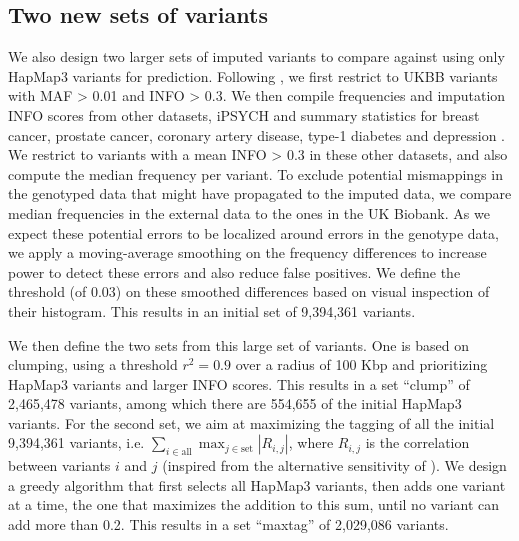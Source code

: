 \subsection{Two new sets of variants}

We also design two larger sets of imputed variants to compare against using only HapMap3 variants for prediction.
Following \cite{prive2021high}, we first restrict to UKBB variants with MAF > 0.01 and INFO > 0.3.
We then compile frequencies and imputation INFO scores from other datasets, iPSYCH and summary statistics for breast cancer, prostate cancer, coronary artery disease, type-1 diabetes and depression \cite[]{bybjerg2020ipsych2015,michailidou2017association,schumacher2018association,nikpay2015comprehensive,censin2017childhood,wray2018genome}.
We restrict to variants with a mean INFO > 0.3 in these other datasets, and also compute the median frequency per variant.
To exclude potential mismappings in the genotyped data \cite[]{kunert2020allele} that might have propagated to the imputed data, we compare median frequencies in the external data to the ones in the UK Biobank.
As we expect these potential errors to be localized around errors in the genotype data, we apply a moving-average smoothing on the frequency differences to increase power to detect these errors and also reduce false positives.
We define the threshold (of 0.03) on these smoothed differences based on visual inspection of their histogram.
This results in an initial set of 9,394,361 variants.

We then define the two sets from this large set of variants.
One is based on clumping, using a threshold $r^2 = 0.9$ over a radius of 100 Kbp and prioritizing HapMap3 variants and larger INFO scores. This results in a set ``clump'' of 2,465,478 variants, among which there are 554,655 of the initial HapMap3 variants.
For the second set, we aim at maximizing the tagging of all the initial 9,394,361 variants, i.e. $\sum_{i \in \text{all}} \max_{j \in \text{set}}{|R_{i,j}|}$, where $R_{i,j}$ is the correlation between variants $i$ and $j$ (inspired from the alternative sensitivity of \cite{agier2016systematic}).
We design a greedy algorithm that first selects all HapMap3 variants, then adds one variant at a time, the one that maximizes the addition to this sum, until no variant can add more than 0.2.
This results in a set ``maxtag'' of 2,029,086 variants.



\FloatBarrier

